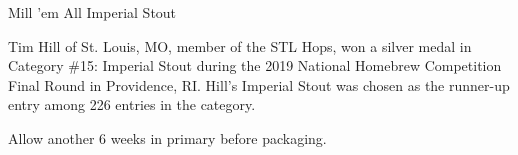 \begin{recipie}{Mill 'em All Imperial Stout}

\begin{aboutblock}
Tim Hill of St. Louis, MO, member of the STL Hops, won a silver medal
in Category \#15: Imperial Stout during the 2019 National Homebrew Competition
Final Round in Providence, RI. Hill's Imperial Stout was chosen as the runner-up
entry among 226 entries in the category. \sourceaha
\end{aboutblock}


\begin{methodandtiming}
 
\begin{mashsteps}
\end{mashsteps}

\begin{fermentationsteps}
\end{fermentationsteps}

\begin{directions}
Allow another 6 weeks in primary before packaging.
\end{directions}

\end{methodandtiming}

\pagebreak

\begin{ingredientsblock}

\begin{malts}
\end{malts}

\begin{hops}
\end{hops}


\end{ingredientsblock}

\end{recipie}

